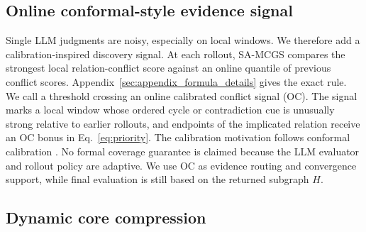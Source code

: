 \documentclass[11pt]{article}
\newcommand{\samcgs}{SA-MCGS}
\newcommand{\oc}{OC}
\begin{document}
\subsection{Online conformal-style evidence signal}

Single LLM judgments are noisy, especially on local windows.  We therefore add a calibration-inspired discovery signal.  At each rollout, \samcgs{} compares the strongest local relation-conflict score against an online quantile of previous conflict scores. Appendix~\ref{sec:appendix_formula_details} gives the exact rule.  We call a threshold crossing an online calibrated conflict signal (\oc{}). The signal marks a local window whose ordered cycle or contradiction cue is unusually strong relative to earlier rollouts, and endpoints of the implicated relation receive an \oc{} bonus in Eq.~\ref{eq:priority}.  The calibration motivation follows conformal calibration \citep{vovk2005algorithmic,gibbs2021adaptive}. No formal coverage guarantee is claimed because the LLM evaluator and rollout policy are adaptive.  We use \oc{} as evidence routing and convergence support, while final evaluation is still based on the returned subgraph $H$.

\subsection{Dynamic core compression}
\label{sec:dynamic-core}
\end{document}
